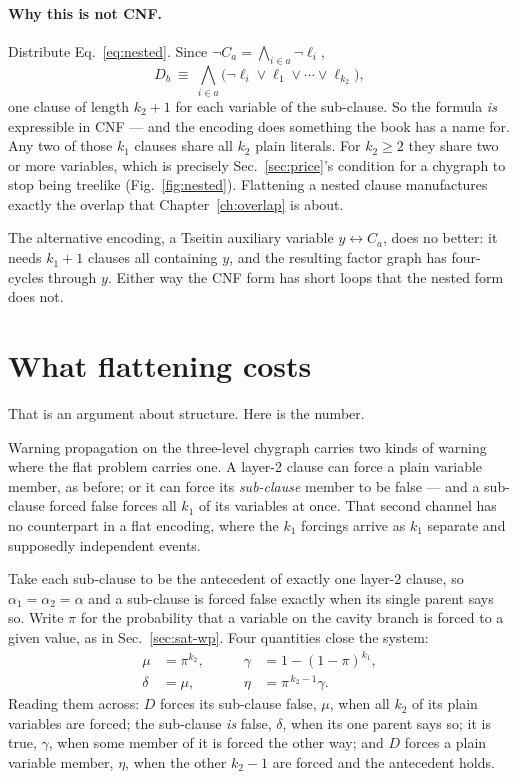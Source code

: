 \paragraph{Why this is not CNF.} Distribute Eq.~\eqref{eq:nested}. Since
$\neg C_{a}=\bigwedge_{i\in a}\neg\ell_{i}$,
\begin{equation}
  D_{b}\ \equiv\ \bigwedge_{i\in a}
    \bigl(\neg\ell_{i}\vee\ell_{1}\vee\cdots\vee\ell_{k_{2}}\bigr),
  \label{eq:flatten}
\end{equation}
one clause of length $k_{2}+1$ for each variable of the sub-clause. So the
formula \emph{is} expressible in CNF --- and the encoding does something the
book has a name for. Any two of those $k_{1}$ clauses share all $k_{2}$ plain
literals. For $k_{2}\ge2$ they share two or more variables, which is precisely
Sec.~\ref{sec:price}'s condition for a chygraph to stop being treelike
(Fig.~\ref{fig:nested}). Flattening a nested clause manufactures exactly the
overlap that Chapter~\ref{ch:overlap} is about.

The alternative encoding, a Tseitin auxiliary variable $y\leftrightarrow C_{a}$,
does no better: it needs $k_{1}+1$ clauses all containing $y$, and the resulting
factor graph has four-cycles through $y$. Either way the CNF form has short
loops that the nested form does not.

\section{What flattening costs}
\label{sec:flatteningcost}

That is an argument about structure. Here is the number.

Warning propagation on the three-level chygraph carries two kinds of warning
where the flat problem carries one. A layer-2 clause can force a plain variable
member, as before; or it can force its \emph{sub-clause} member to be false ---
and a sub-clause forced false forces all $k_{1}$ of its variables at once. That
second channel has no counterpart in a flat encoding, where the $k_{1}$
forcings arrive as $k_{1}$ separate and supposedly independent events.

Take each sub-clause to be the antecedent of exactly one layer-2 clause, so
$\alpha_{1}=\alpha_{2}=\alpha$ and a sub-clause is forced false exactly when its
single parent says so. Write $\pi$ for the probability that a variable on the
cavity branch is forced to a given value, as in Sec.~\ref{sec:sat-wp}. Four
quantities close the system:
\[
  \begin{aligned}
    \mu&=\pi^{k_{2}}, &\qquad \gamma&=1-(1-\pi)^{k_{1}},\\
    \delta&=\mu, &\qquad \eta&=\pi^{\,k_{2}-1}\gamma.
  \end{aligned}
\]
Reading them across: $D$ forces its sub-clause false, $\mu$, when all $k_{2}$ of
its plain variables are forced; the sub-clause \emph{is} false, $\delta$, when
its one parent says so; it is true, $\gamma$, when some member of it is forced
the other way; and $D$ forces a plain variable member, $\eta$, when the other
$k_{2}-1$ are forced and the antecedent holds.

